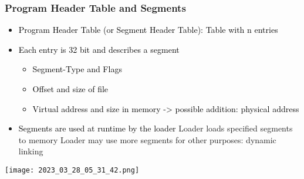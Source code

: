 \documentclass[main.tex,fontsize=8pt,paper=a4,paper=portrait,DIV=calc,]{scrartcl}
\begin{document}
\subsubsection{Program Header Table and Segments}
\begin{itemize}
\item \textcolor{black}{Program Header Table (or Segment Header Table): Table with n entries}
\item \textcolor{black}{Each entry is 32 bit and describes a segment}\newline
  \begin{itemize}
  \item \textcolor{black}{Segment-Type and Flags}
  \item \textcolor{black}{Offset and size of file}
  \item \textcolor{black}{Virtual address and size in memory -> possible addition: physical address}
  \end{itemize} 
\item \textcolor{black}{Segments are used at runtime by the loader}\newline
  Loader loads specified segments to memory\newline
  Loader may use more segments for other purposes: dynamic linking
\end{itemize} 
\texttt{[image: 2023\_03\_28\_05\_31\_42.png]}
\end{document}
